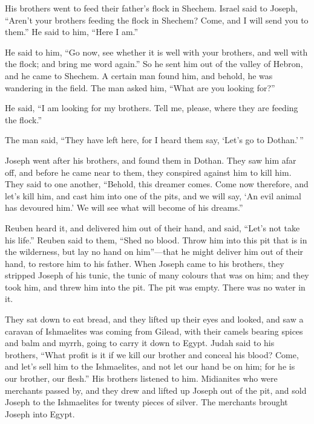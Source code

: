  His brothers went to feed their father's flock in
Shechem.  Israel said to Joseph, ``Aren't your brothers
feeding the flock in Shechem? Come, and I will send you to them.'' He
said to him, ``Here I am.''

 He said to him, ``Go now, see whether it is well with
your brothers, and well with the flock; and bring me word again.'' So he
sent him out of the valley of Hebron, and he came to Shechem.
 A certain man found him, and behold, he was wandering in
the field. The man asked him, ``What are you looking for?''

 He said, ``I am looking for my brothers. Tell me,
please, where they are feeding the flock.''

 The man said, ``They have left here, for I heard them
say, `Let's go to Dothan.'\,''

Joseph went after his brothers, and found them in Dothan.
 They saw him afar off, and before he came near to them,
they conspired against him to kill him.  They said to one
another, ``Behold, this dreamer comes.  Come now
therefore, and let's kill him, and cast him into one of the pits, and we
will say, `An evil animal has devoured him.' We will see what will
become of his dreams.''

 Reuben heard it, and delivered him out of their hand,
and said, ``Let's not take his life.''  Reuben said to
them, ``Shed no blood. Throw him into this pit that is in the
wilderness, but lay no hand on him''---that he might deliver him out of
their hand, to restore him to his father.  When Joseph
came to his brothers, they stripped Joseph of his tunic, the tunic of
many colours that was on him;  and they took him, and
threw him into the pit. The pit was empty. There was no water in it.

 They sat down to eat bread, and they lifted up their
eyes and looked, and saw a caravan of Ishmaelites was coming from
Gilead, with their camels bearing spices and balm and myrrh, going to
carry it down to Egypt.  Judah said to his brothers,
``What profit is it if we kill our brother and conceal his blood?
 Come, and let's sell him to the Ishmaelites, and not let
our hand be on him; for he is our brother, our flesh.'' His brothers
listened to him.  Midianites who were merchants passed
by, and they drew and lifted up Joseph out of the pit, and sold Joseph
to the Ishmaelites for twenty pieces of silver. The merchants brought
Joseph into Egypt.

